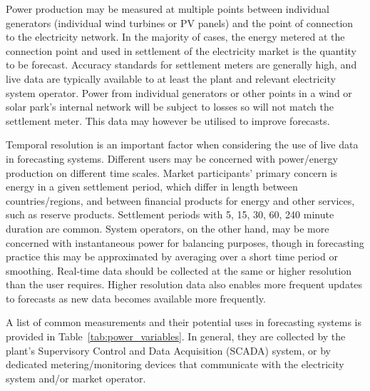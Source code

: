 Power production may be measured at multiple points between individual generators (individual wind turbines or PV panels) and the point of connection to the electricity network. In the majority of cases, the energy metered at the connection point and used in settlement of the electricity market is the quantity to be forecast. Accuracy standards for settlement meters are generally high, and live data are typically available to at least the plant and relevant electricity system operator. Power from individual generators or other points in a wind or solar park's internal network will be subject to losses so will not match the settlement meter. This data may however be utilised to improve forecasts.

Temporal resolution is an important factor when considering the use of live data in forecasting systems. Different users may be concerned with power/energy production on different time scales. Market participants' primary concern is energy in a given settlement period, which differ in length between countries/regions, and between financial products for energy and other services, such as reserve products. Settlement periods with 5, 15, 30, 60, 240 minute duration are common. System operators, on the other hand, may be more concerned with instantaneous power for balancing purposes, though in forecasting practice this may be approximated by averaging over a short time period or smoothing. Real-time data should be collected at the same or higher resolution than the user requires. Higher resolution data also enables more frequent updates to forecasts as new data becomes available more frequently.

A list of common measurements and their potential uses in forecasting systems is provided in Table~\ref{tab:power_variables}. In general, they are collected by the plant's Supervisory Control and Data Acquisition (SCADA) system, or by dedicated metering/monitoring devices that communicate with the electricity system and/or market operator.

